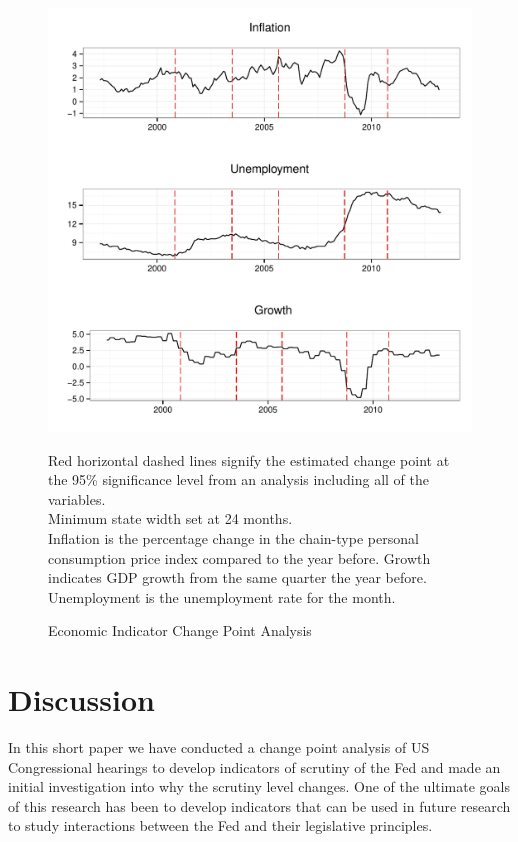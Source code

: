 \documentclass[a4paper]{article}\usepackage[]{graphicx}\usepackage[]{color}
\newenvironment{knitrout}{}{} %
\begin{document}
\begin{figure}
    \caption{Economic Indicator Change Point Analysis}
    \label{fig:FullEconCP}
\begin{knitrout}
\color{fgcolor}

{\centering \includegraphics[width=0.8\linewidth]{figure/EconFullCP} 

}



\end{knitrout}
{\scriptsize{Red horizontal dashed lines signify the estimated change point at the 95\% significance level from an analysis including all of the variables.\\
Minimum state width set at 24 months. \\
Inflation is the percentage change in the chain-type personal consumption price index compared to the year before. Growth indicates GDP growth from the same quarter the year before. Unemployment is the unemployment rate for the month.}}
\end{figure}


\section{Discussion}

In this short paper we have conducted a change point analysis of US Congressional hearings to develop indicators of scrutiny of the Fed and made an initial investigation into why the scrutiny level changes. One of the ultimate goals of this research has been to develop indicators that can be used in future research to study interactions between the Fed and their legislative principles.
\end{document}
